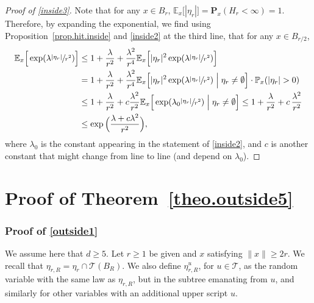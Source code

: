 \documentclass[JEP,XML,SOM,Unicode,NoFloatCountersInSection,published]{cedram}
\theoremstyle{plain}
\theoremstyle{definition}
\newcommand{\1}{{\text{\Large $\mathfrak 1$}}}
\begin{document}
\begin{proof}[Proof of \eqref{inside3}]
Note that for any $x\in B_r$, $\mathbb E_x\big[|\eta_r|\big] =
\mathbf P_x(H_r<\infty) = 1$.
Therefore, by expanding the exponential,
we find using Proposition~\ref{prop.hit.inside} and \eqref{inside2} at the third line, that for any $x\in B_{r/2}$,
\begin{align*}
\mathbb E_x\Big[\exp(\lambda
\sfrac{|\eta_r|}{r^2})\Big] & \le 1 + \frac{\lambda}{r^2} + \frac{\lambda^2}{r^4} \mathbb E_x\Big[|\eta_r|^2\exp(\lambda \sfrac{|\eta_r|}{r^2})\Big]\\
& = 1 + \frac{\lambda}{r^2} + \frac{\lambda^2}{r^4} \mathbb E_x\Big[|\eta_r|^2 \exp(\lambda \sfrac{|\eta_r|}{r^2})\Bigm|\eta_r \neq \emptyset \Big]\cdot \mathbb P_x(|\eta_r|>0) \\
&\le 1+ \frac{\lambda}{r^2} + c\frac{\lambda^2}{r^2} \mathbb E_x\Big[ \exp(\lambda_0 \sfrac{|\eta_r|}{r^2})\Bigm|\eta_r\neq \emptyset \Big] \le 1+ \frac{\lambda}{r^2} + c\,\frac{\lambda^2}{r^2}\\
& \le \exp\Big(\frac{\lambda + c\lambda^2}{r^2}\Big),
\end{align*}
where $\lambda_0$ is the constant appearing in the statement of \eqref{inside2}, and $c$ is another constant that might change from line to line (and depend on $\lambda_0$).
\end{proof}

\section{Proof of Theorem~\ref{theo.outside5}}\label{sec-outside5}
\subsubsection*{Proof of \eqref{outside1}}
We assume here that $d\ge 5$. Let $r\ge 1$ be given and $x$ satisfying $\|x\|\ge 2r$.
We recall that $\eta_{r,R}=\eta_r\cap \mathcal T(B_R)$. We also define $\eta_{r,R}^u$, for $u\in \mathcal T$, as the random variable with the
same law as $\eta_{r,R}$, but in the subtree emanating from $u$, and similarly for other variables with an additional upper script $u$.
\end{document}
